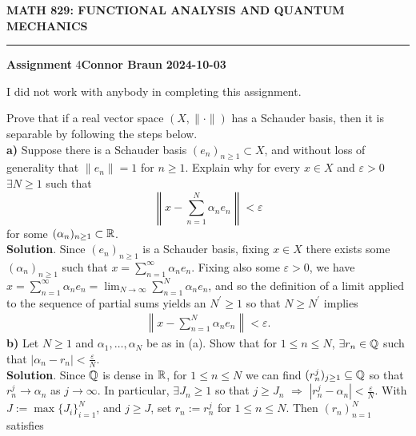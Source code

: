 \documentclass[10pt]{article}
\newcommand{\1}[1]{\mathbbm{1}_{#1}} \newcommand{\mc}[1]{\mathcal{#1}}
\begin{document}
    \begin{center}
        {\bf\large{MATH 829: FUNCTIONAL ANALYSIS AND QUANTUM MECHANICS}}
        \smallskip
        \hrule
        \smallskip
        {\bf Assignment} 4\hfill {\bf Connor Braun} \hfill {\bf 2024-10-03}
    \end{center}
    \vspace{5pt}
    \begin{center}
        \begin{minipage}{\dimexpr\paperwidth-10cm}
            I did not work with anybody in completing this assignment.
        \end{minipage}
    \end{center}
     Prove that if a real vector space $(X,\|\cdot\|)$
    has a Schauder basis, then it is separable by following the steps
    below.\\[5pt]
    {\bf a)} Suppose there is a Schauder basis $(e_n)_{n\geq 1}\subset X$, and
    without loss of generality that $\|e_n\|=1$ for $n\geq 1$. Explain why for
    every $x\in X$ and $\varepsilon>0$ $\exists N\geq 1$ such that
    \[\left\|x-\sum_{n=1}^N\alpha_n e_n\right\|<\varepsilon\] for some
    $(\alpha_n)_{n\geq 1}\subset\mathbb{R}$.\\[5pt]
    {\bf Solution}. Since $(e_n)_{n\geq 1}$ is a Schauder basis, fixing $x\in X$
    there exists some $(\alpha_n)_{n\geq 1}$ such that
    $x=\sum_{n=1}^\infty\alpha_n e_n$. Fixing also some $\varepsilon>0$, we have
    $x=\sum_{n=1}^\infty\alpha_n
    e_n=\lim_{N\rightarrow\infty}\sum_{n=1}^N\alpha_ne_n$, and so the definition
    of a limit applied to the sequence of partial sums yields an $N^\prime\geq
    1$ so that $N\geq N^\prime$ implies
    \begin{align*}
        \left\|x-\sum_{n=1}^N\alpha_n e_n\right\|<\varepsilon.\tag*{$\qed$}
    \end{align*}
    {\bf b)} Let $N\geq 1$ and $\alpha_1,\dots, \alpha_N$ be as in (a). Show
    that for $1\leq n\leq N$, $\exists r_n\in\mathbb{Q}$ such that
    $|\alpha_n-r_n|<\tfrac{\varepsilon}{N}$.\\[5pt]
    {\bf Solution}. Since $\mathbb{Q}$ is dense in $\mathbb{R}$, for $1\leq n\leq N$
    we can find $(r_n^j)_{j\geq 1}\subseteq\mathbb{Q}$ so that $r^j_n\rightarrow
    \alpha_n$ as $j\rightarrow\infty$. In particular, $\exists J_n\geq 1$ so
    that $j\geq J_n$ $\Rightarrow$ $|r_n^j-\alpha_n|<\tfrac{\varepsilon}{N}$.
    With $J:=\max\{J_i\}_{i=1}^N$, and $j\geq J$, set $r_n:=r_n^j$ for $1\leq
    n\leq N$. Then $(r_n)_{n=1}^N$ satisfies
\end{document}
